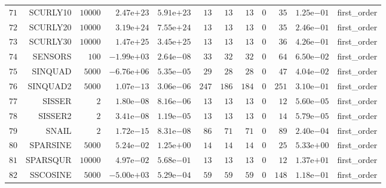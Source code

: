 \begin{longtable}{rrrrrrrrrrrr}
  \(    71\) & SCURLY10 & \( 10000\) & \( 2.47\)e\(+23\) & \( 5.91\)e\(+23\) & \(    13\) & \(    13\) & \(    13\) & \(     0\) & \(    35\) & \( 1.25\)e\(-01\) & first\_order \\
  \(    72\) & SCURLY20 & \( 10000\) & \( 3.19\)e\(+24\) & \( 7.55\)e\(+24\) & \(    13\) & \(    13\) & \(    13\) & \(     0\) & \(    35\) & \( 2.46\)e\(-01\) & first\_order \\
  \(    73\) & SCURLY30 & \( 10000\) & \( 1.47\)e\(+25\) & \( 3.45\)e\(+25\) & \(    13\) & \(    13\) & \(    13\) & \(     0\) & \(    36\) & \( 4.26\)e\(-01\) & first\_order \\
  \(    74\) & SENSORS & \(   100\) & \(-1.99\)e\(+03\) & \( 2.64\)e\(-08\) & \(    33\) & \(    32\) & \(    32\) & \(     0\) & \(    64\) & \( 6.50\)e\(-02\) & first\_order \\
  \(    75\) & SINQUAD & \(  5000\) & \(-6.76\)e\(+06\) & \( 5.35\)e\(-05\) & \(    29\) & \(    28\) & \(    28\) & \(     0\) & \(    47\) & \( 4.04\)e\(-02\) & first\_order \\
  \(    76\) & SINQUAD2 & \(  5000\) & \( 1.07\)e\(-13\) & \( 3.06\)e\(-06\) & \(   247\) & \(   186\) & \(   184\) & \(     0\) & \(   251\) & \( 3.10\)e\(-01\) & first\_order \\
  \(    77\) & SISSER & \(     2\) & \( 1.80\)e\(-08\) & \( 8.16\)e\(-06\) & \(    13\) & \(    13\) & \(    13\) & \(     0\) & \(    12\) & \( 5.60\)e\(-05\) & first\_order \\
  \(    78\) & SISSER2 & \(     2\) & \( 3.41\)e\(-08\) & \( 1.19\)e\(-05\) & \(    13\) & \(    13\) & \(    13\) & \(     0\) & \(    14\) & \( 5.79\)e\(-05\) & first\_order \\
  \(    79\) & SNAIL & \(     2\) & \( 1.72\)e\(-15\) & \( 8.31\)e\(-08\) & \(    86\) & \(    71\) & \(    71\) & \(     0\) & \(    89\) & \( 2.40\)e\(-04\) & first\_order \\
  \(    80\) & SPARSINE & \(  5000\) & \( 5.24\)e\(-02\) & \( 1.25\)e\(+00\) & \(    14\) & \(    14\) & \(    14\) & \(     0\) & \(    25\) & \( 5.33\)e\(+00\) & first\_order \\
  \(    81\) & SPARSQUR & \( 10000\) & \( 4.97\)e\(-02\) & \( 5.68\)e\(-01\) & \(    13\) & \(    13\) & \(    13\) & \(     0\) & \(    12\) & \( 1.37\)e\(+01\) & first\_order \\
  \(    82\) & SSCOSINE & \(  5000\) & \(-5.00\)e\(+03\) & \( 5.29\)e\(-04\) & \(    59\) & \(    59\) & \(    59\) & \(     0\) & \(   148\) & \( 1.18\)e\(-01\) & first\_order \\

\end{longtable}
